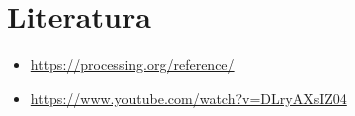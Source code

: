 \documentclass[12pt]{article}
\begin{document}
\section{Literatura}
\begin{itemize}
  \item \url{https://processing.org/reference/}
  \item \url{https://www.youtube.com/watch?v=DLryAXsIZ04}
\end{itemize}

\newpage


\clearpage

\hfill
\end{document}
